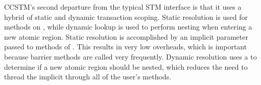 
CCSTM's second departure from the typical STM interface is that it uses
a hybrid of static and dynamic transaction scoping.  Static resolution
is used for methods on , while dynamic lookup is used to
perform nesting when entering a new atomic region.  Static resolution
is accomplished by an implicit  parameter passed to methods
of .  This results in very low overheads, which is important
because barrier methods are called very frequently.  Dynamic resolution
uses a  to determine if a new atomic region should
be nested, which reduces the need to thread the implicit 
through all of the user's methods.


